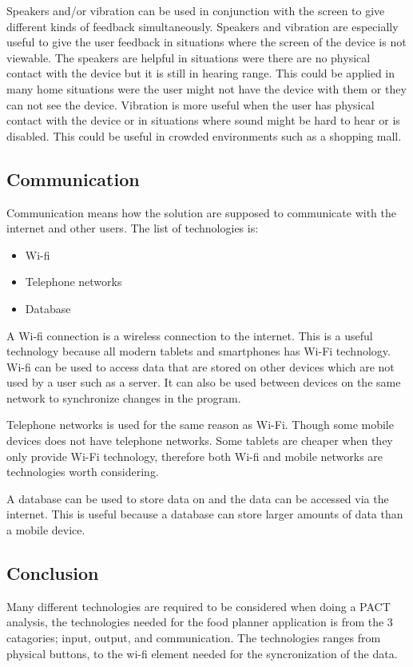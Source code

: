 Speakers and/or vibration can be used in conjunction with the screen to give different kinds of feedback simultaneously.
Speakers and vibration are especially useful to give the user feedback in situations where the screen of the device is not viewable.
The speakers are helpful in situations were there are no physical contact with the device but it is still in hearing range.
This could be applied in many home situations were the user might not have the device with them or they can not see the device.
Vibration is more useful when the user has physical contact with the device or in situations where sound might be hard to hear or is disabled.
This could be useful in crowded environments such as a shopping mall.     

\subsection{Communication}

Communication means how the solution are supposed to communicate with the internet and other users. The list of technologies is:

\begin{itemize}
	\item Wi-fi
	\item Telephone networks    
    \item Database
\end{itemize}

A Wi-fi connection is a wireless connection to the internet.
This is a useful technology because all modern tablets and smartphones has Wi-Fi technology.
Wi-fi can be used to access data that are stored on other devices which are not used by a user such as a server.
It can also be used between devices on the same network to synchronize changes in the program.    


Telephone networks is used for the same reason as Wi-Fi. Though some mobile devices does not have telephone networks.
Some tablets are cheaper when they only provide Wi-Fi technology, therefore both Wi-fi and mobile networks are technologies worth considering.

A database can be used to store data on and the data can be accessed via the internet.
This is useful because a database can store larger amounts of data than a mobile device.
 
\subsection{Conclusion}

Many different technologies are required to be considered when doing a PACT analysis, the technologies needed for the food planner application is from the 3 catagories; input, output, and communication.
The technologies ranges from physical buttons, to the wi-fi element needed for the syncronization of the data.
